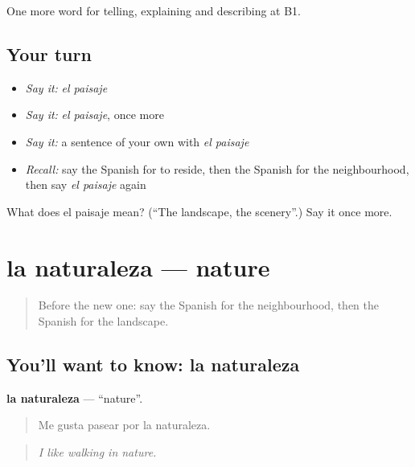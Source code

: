\begin{grammarlens}[title={What you've built}]
One more word for telling, explaining and describing at B1.
\end{grammarlens}

\subsection*{Your turn}
\begin{itemize}
\raggedright
  \item \emph{Say it:} \emph{el paisaje}
  \item \emph{Say it:} \emph{el paisaje}, once more
  \item \emph{Say it:} a sentence of your own with \emph{el paisaje}
  \item \emph{Recall:} say the Spanish for to reside, then the Spanish for the neighbourhood, then say \emph{el paisaje} again
\end{itemize}

\begin{tcolorbox}[breakable,colback=teal!4,colframe=teal!35!black,title={Before you move on}]
What does el paisaje mean? (\textquotedblleft{}The landscape, the scenery\textquotedblright{}.) Say it once more.
\end{tcolorbox}
\section[la naturaleza]{la naturaleza — nature}

\label{lesson:ES-C685-naturaleza}



\begin{quote}
Before the new one: say the Spanish for the neighbourhood, then the Spanish for the landscape.
\end{quote}

\subsection*{You'll want to know: la naturaleza}
\textbf{la naturaleza} — \textquotedblleft{}nature\textquotedblright{}.

\begin{quote}
Me gusta pasear por la naturaleza.
\end{quote}

\begin{quote}
\emph{I like walking in nature.}
\end{quote}

